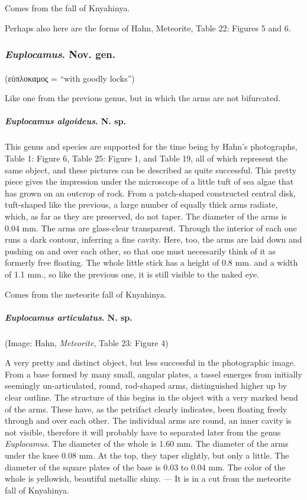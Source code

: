 \documentclass[a4paper, 12pt, oneside]{article}
\begin{document}
Comes from the fall of Knyahinya.

Perhaps also here are the forms of Hahn, Meteorite, Table 22: Figures 5 and 6.
\subsubsection{\emph{Euplocamus}. Nov. gen.}
\paragraph*{}
(εὐπλοκαμος = ``with goodly locks'')%

Like one from the previous genus, but in which the arms are not bifurcated.
\paragraph{\emph{Euplocamus algoideus}. N. sp.}
\subparagraph{}
This genus and species are supported for the time being by Hahn's photographs, Table 1: Figure 6, Table 25: Figure 1, and Table 19, all of which represent the same object, and these pictures can be described as quite successful. This pretty piece gives the impression under the microscope of a little tuft of sea algae that has grown on an outcrop of rock. From a patch-shaped constructed central disk, tuft-shaped like the previous, a large number of equally thick arms radiate, which, as far as they are preserved, do not taper. The diameter of the arms is 0.04 mm. The arms are glass-clear transparent. Through the interior of each one runs a dark contour, inferring a fine cavity. Here, too, the arms are laid down and pushing on and over each other, so that one must necessarily think of it as formerly free floating. The whole little stick has a height of 0.8 mm. and a width of 1.1 mm., so like the previous one, it is still visible to the naked eye.

Comes from the meteorite fall of Knyahinya.
\paragraph{\emph{Euplocamus articulatus}. N. sp.}
\subparagraph{}
(Image: Hahn, \emph{Meteorite}, Table 23: Figure 4)

A very pretty and distinct object, but less successful in the photographic image. From a base formed by many small, angular plates, a tassel emerges from initially seemingly un-articulated, round, rod-shaped arms, distinguished higher up by clear outline. The structure of this begins in the object with a very marked bend of the arms. These have, as the petrifact clearly indicates, been floating freely through and over each other. The individual arms are round, an inner cavity is not visible, therefore it will probably have to separated later from the genus \emph{Euplocamus}. The diameter of the whole is 1.60 mm. The diameter of the arms under the knee 0.08 mm. At the top, they taper slightly, but only a little. The diameter of the square plates of the base is 0.03 to 0.04 mm. The color of the whole is yellowish, beautiful metallic shiny. --- It is in a cut from the meteorite fall of Knyahinya.
\end{document}
